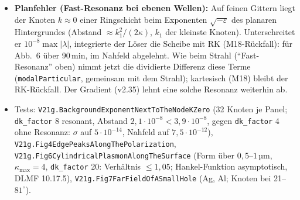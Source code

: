 \begin{itemize}[nosep]
        160 und $320k_0$ auf $10^{-3}$): bei $69^\circ$ $E$-Ebene Ag $0{,}38$, Al $0{,}74$; $H$-Ebene beide $0{,}13
        =\cos^2\theta$ (magnetischer Dipol, auf 4\,\%). $33\varepsilon_{\text{Al}}$ ist flacher als Al
        ($0{,}82$--$0{,}99$ bei $69^\circ$), aber nicht konvergiert: $P(0)=2{,}9\cdot10^{-10}$, $4{,}2\cdot10^{-14}$,
        $5{,}6\cdot10^{-15}$ bei $k_{\max}=80$, 160, $320k_0$ (das Signal $\sigma_\downarrow\approx2\cdot10^{-14}$\,µm$^2$
        liegt weit unter dem Fehler der abgeschnittenen Basis, die ein fast ideales Metall zu durchlässig darstellt).
        $1000\varepsilon_{\text{Al}}$ ist bei allen $k_{\max}$ flach ($0{,}98$--$1{,}02$), $P(0)$ ebenso nicht
        konvergiert ($3{,}6\cdot10^{-10}$, $2{,}6\cdot10^{-11}$, $1{,}7\cdot10^{-13}$). Hoch leitende Schirme bleiben
        daher aus dem Test; $\kappa_{\max}$ bezieht sich auf $\max\operatorname{Re}n$
        und ist für sie entsprechend klein zu wählen ($k_{\max}=\kappa_{\max}\operatorname{Re}n$).
  \item \textbf{Planfehler (Fast-Resonanz bei ebenen Wellen):} Auf feinen Gittern liegt der Knoten $k\approx0$ einer
        Ringschicht beim Exponenten $\sqrt{-\varepsilon}$ des planaren Hintergrundes (Abstand $\approx k_1^2/(2\kappa)$,
        $k_1$ der kleinste Knoten). Unterschreitet er $10^{-8}\max|\lambda|$, integrierte der Löser die Scheibe mit RK
        (M18-Rückfall): für Abb.~6 über 90\,min, im Nahfeld abgelehnt. Wie beim Strahl (\enquote{Fast-Resonanz} oben)
        nimmt jetzt die dividierte Differenz diese Terme (\verb|modalParticular|, gemeinsam mit dem Strahl); kartesisch
        (M18) bleibt der RK-Rückfall. Der Gradient (v2.35) lehnt eine solche Resonanz weiterhin ab.
  \item Tests: \verb|V21g.BackgroundExponentNextToTheNodeKZero| (32 Knoten je Panel; \verb|dk_factor| 8 resonant,
        Abstand $2{,}1\cdot10^{-8}<3{,}9\cdot10^{-8}$, gegen \verb|dk_factor| 4 ohne Resonanz: $\sigma$ auf $5\cdot10^{-14}$,
        Nahfeld auf $7{,}5\cdot10^{-12}$), \verb|V21g.Fig4EdgePeaksAlongThePolarization|,
        \verb|V21g.Fig6CylindricalPlasmonAlongTheSurface| (Form über $0{,}5$--$1$\,µm, $\kappa_{\max}=4$, \verb|dk_factor| 20:
        Verhältnis $\le1{,}05$; Hankel-Funktion asymptotisch, DLMF 10.17.5), \verb|V21g.Fig7FarFieldOfASmallHole|
        (Ag, Al; Knoten bei 21--$81^\circ$).
\end{itemize}

